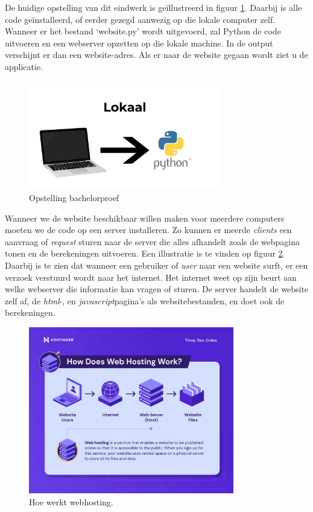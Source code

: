 De huidige opstelling van dit eindwerk is geïllustreerd in figuur \ref{fig:opstelling_bachelorproef}. Daarbij is alle code geïnstalleerd, of eerder gezegd aanwezig op die lokale computer zelf. Wanneer er het bestand `website.py' wordt uitgevoerd, zal Python de code uitvoeren en een webserver opzetten op die lokale machine. In de output verschijnt er dan een website-adres. Als er naar de website gegaan wordt ziet u de applicatie.

\begin{figure}
    \centering
    \includegraphics[width=0.75\textwidth]{./img/lokaal_website}
    \caption{\label{fig:opstelling_bachelorproef} Opstelling bachelorproef}
\end{figure}

Wanneer we de website beschikbaar willen maken voor meerdere computers moeten we de code op een server installeren. Zo kunnen er meerde \textit{clients} een aanvraag of \textit{request} sturen naar de server die alles afhandelt zoals de webpagina tonen en de berekeningen uitvoeren. Een illustratie is te vinden op figuur \ref{fig:webhosting_scheme}. Daarbij is te zien dat wanneer een gebruiker of \textit{user} naar een website surft, er een verzoek verstuurd wordt naar het internet. Het internet weet op zijn beurt aan welke webserver die informatie kan vragen of sturen. De server handelt de website zelf af, de \textit{html}-, en \textit{javascript}pagina's als websitebestanden, en doet ook de berekeningen.

\begin{figure}
    \centering
    \includegraphics[width=0.8\textwidth]{./img/how-does-web-hosting-work}
    \caption{\label{fig:webhosting_scheme} Hoe werkt webhosting.~\autocite{Tamara2022}}
\end{figure}

